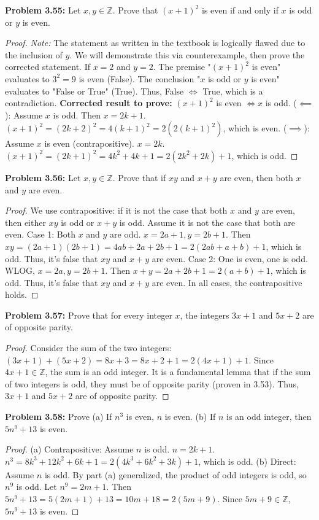 \documentclass[11pt, letterpaper]{article}
\theoremstyle{definition}
\theoremstyle{remark}
\newcommand{\Z}{\mathbb{Z}}
\begin{document}
\textbf{Problem 3.55:} Let $x, y \in \Z$. Prove that $(x+1)^2$ is even if and only if $x$ is odd or $y$ is even.
\begin{proof}
\textit{Note:} The statement as written in the textbook is logically flawed due to the inclusion of $y$. We will demonstrate this via counterexample, then prove the corrected statement.
If $x=2$ and $y=2$. The premise "$(x+1)^2$ is even" evaluates to $3^2=9$ is even (False). The conclusion "$x$ is odd or $y$ is even" evaluates to "False or True" (True). Thus, False $\iff$ True, which is a contradiction.
\textbf{Corrected result to prove:} $(x+1)^2$ is even $\iff x$ is odd.
($\impliedby$): Assume $x$ is odd. Then $x=2k+1$. $(x+1)^2 = (2k+2)^2 = 4(k+1)^2 = 2(2(k+1)^2)$, which is even.
($\implies$): Assume $x$ is even (contrapositive). $x=2k$. $(x+1)^2 = (2k+1)^2 = 4k^2+4k+1 = 2(2k^2+2k)+1$, which is odd.
\end{proof}

\textbf{Problem 3.56:} Let $x,y \in \Z$. Prove that if $xy$ and $x+y$ are even, then both $x$ and $y$ are even.
\begin{proof}
We use contrapositive: if it is not the case that both $x$ and $y$ are even, then either $xy$ is odd or $x+y$ is odd.
Assume it is not the case that both are even. 
Case 1: Both $x$ and $y$ are odd. $x=2a+1, y=2b+1$. Then $xy = (2a+1)(2b+1) = 4ab+2a+2b+1 = 2(2ab+a+b)+1$, which is odd. Thus, it's false that $xy$ and $x+y$ are even.
Case 2: One is even, one is odd. WLOG, $x=2a, y=2b+1$. Then $x+y = 2a+2b+1 = 2(a+b)+1$, which is odd. Thus, it's false that $xy$ and $x+y$ are even.
In all cases, the contrapositive holds.
\end{proof}

\textbf{Problem 3.57:} Prove that for every integer $x$, the integers $3x+1$ and $5x+2$ are of opposite parity.
\begin{proof}
Consider the sum of the two integers:
$(3x+1) + (5x+2) = 8x + 3 = 8x + 2 + 1 = 2(4x+1) + 1$.
Since $4x+1 \in \Z$, the sum is an odd integer. It is a fundamental lemma that if the sum of two integers is odd, they must be of opposite parity (proven in 3.53). Thus, $3x+1$ and $5x+2$ are of opposite parity.
\end{proof}

\textbf{Problem 3.58:} Prove (a) If $n^3$ is even, $n$ is even. (b) If $n$ is an odd integer, then $5n^9 + 13$ is even.
\begin{proof}
(a) Contrapositive: Assume $n$ is odd. $n=2k+1$. $n^3 = 8k^3+12k^2+6k+1 = 2(4k^3+6k^2+3k)+1$, which is odd.
(b) Direct: Assume $n$ is odd. By part (a) generalized, the product of odd integers is odd, so $n^9$ is odd. Let $n^9 = 2m+1$. Then $5n^9 + 13 = 5(2m+1) + 13 = 10m + 18 = 2(5m + 9)$. Since $5m+9 \in \Z$, $5n^9+13$ is even.
\end{proof}
\end{document}
